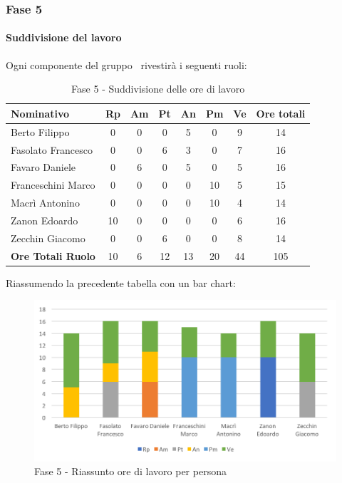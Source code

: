 \documentclass[../PianoDiProgetto.tex]{subfiles}
\begin{document}
		\newpage
		\subsubsection{Fase 5}
			\paragraph{Suddivisione del lavoro}
			Ogni componente del gruppo \kpanic\ rivestirà i seguenti ruoli:
			\begin{table}[h]
				\begin{tabularx}{\textwidth}{l * {6}{C} c}
				\toprule
				\textbf{Nominativo} & \textbf{Rp} & \textbf{Am} & \textbf{Pt} & \textbf{An} & \textbf{Pm} & \textbf{Ve} & \textbf{Ore totali} \\
				\midrule
				Berto Filippo &	0 & 0 & 0 & 5 & 0 & 9 & 14 \\
				Fasolato Francesco & 0 & 0 & 6 & 3 & 0 & 7 & 16 \\
				Favaro Daniele & 0 & 6 & 0 & 5 & 0 & 5 & 16 \\
				Franceschini Marco & 0 & 0 & 0 & 0 & 10 & 5 & 15 \\
				Macrì Antonino & 0 & 0 & 0 & 0 & 10 & 4 & 14 \\
				Zanon Edoardo &	10 & 0 & 0 & 0 & 0 & 6 & 16 \\
				Zecchin Giacomo & 0 & 0 & 6 & 0 & 0 & 8 & 14 \\
				\midrule			
				\textbf{Ore Totali Ruolo} & 10 & 6 & 12 & 13 & 20 & 44 & 105 \\
				\bottomrule
				\end{tabularx}
				\caption{Fase 5 - Suddivisione delle ore di lavoro}		
			\end{table}

			Riassumendo la precedente tabella con un bar chart:	
			\begin{figure}[!h]
				\centering
				\includegraphics[width=\textwidth]{Preventivo/Immagini/fase5_oreRuoloPersona.png}
				\caption{Fase 5 - Riassunto ore di lavoro per persona}
			\end{figure}	
			
\end{document}
